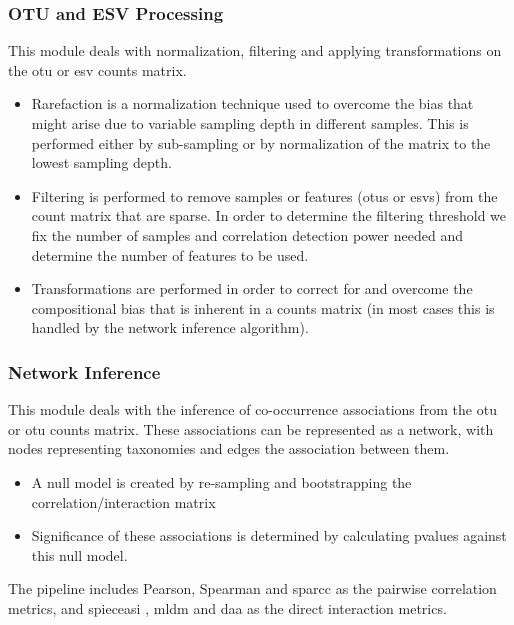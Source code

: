     \subsubsection*{OTU and ESV Processing}
      \vspace{-5mm}
      This module deals with normalization, filtering and applying transformations on the \ac{otu} or \ac{esv} counts matrix.
      \begin{itemize}
        \item Rarefaction is a normalization technique used to overcome the bias that might arise due to variable sampling depth in different samples. This is performed either by sub-sampling or by normalization of the matrix to the lowest sampling depth.
        \item Filtering is performed to remove samples or features (\ac{otu}s or \ac{esv}s) from the count matrix that are sparse. In order to determine the filtering threshold we fix the number of samples and correlation detection power needed  and determine the number of features to be used.
        \item Transformations are performed in order to correct for and overcome the compositional bias that is inherent in a counts matrix (in most cases this is handled by the network inference algorithm).
      \end{itemize}

    \subsubsection*{Network Inference}
      \vspace{-5mm}
      This module deals with the inference of co-occurrence associations from the \ac{otu} or \ac{otu} counts matrix. These associations can be represented as a network, with nodes representing taxonomies and edges the association between them.
      \begin{itemize}
        \item A null model is created by re-sampling and bootstrapping the correlation/interaction matrix
        \item Significance of these associations is determined by calculating pvalues against this null model.
      \end{itemize}
      The pipeline includes Pearson, Spearman and \ac{sparcc} \cite{Friedman2012} as the pairwise correlation metrics, and \ac{spieceasi} \cite{Kurtz2015}, \ac{mldm} \cite{Yang2017} and \ac{daa} \cite{Menon2018} as the direct interaction metrics.


